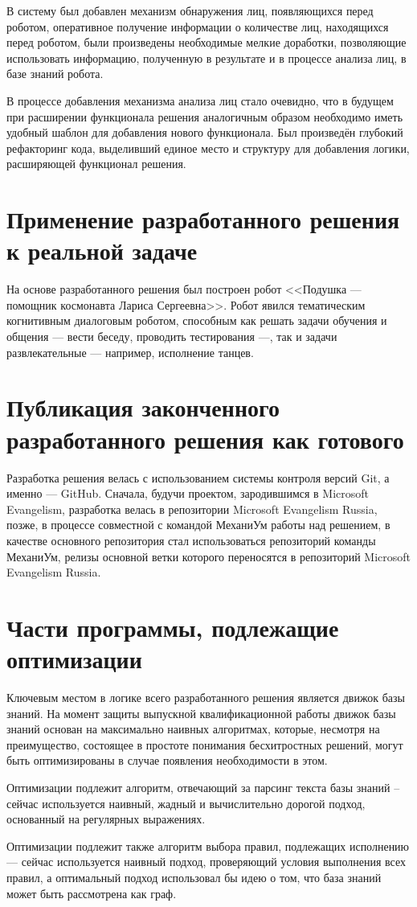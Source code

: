 В систему был добавлен механизм обнаружения лиц, появляющихся перед роботом, оперативное получение информации о количестве лиц, находящихся перед роботом, были произведены необходимые мелкие доработки, позволяющие использовать информацию, полученную в результате и в процессе анализа лиц, в базе знаний робота.

В процессе добавления механизма анализа лиц стало очевидно, что в будущем при расширении функционала решения аналогичным образом необходимо иметь удобный шаблон для добавления нового функционала. Был произведён глубокий рефакторинг кода, выделивший единое место и структуру для добавления логики, расширяющей функционал решения.


\section{Применение разработанного решения к реальной задаче}
На основе разработанного решения был построен робот <<Подушка --- помощник космонавта Лариса Сергеевна>>. Робот явился тематическим когнитивным диалоговым роботом, способным как решать задачи обучения и общения --- вести беседу, проводить тестирования ---, так и задачи развлекательные --- например, исполнение танцев.


\section{Публикация законченного разработанного решения как готового}
Разработка решения велась с использованием системы контроля версий Git, а именно --- GitHub. Сначала, будучи проектом, зародившимся в Microsoft Evangelism, разработка велась в репозитории Microsoft Evangelism Russia, позже, в процессе совместной с командой МеханиУм работы над решением, в качестве основного репозитория стал использоваться репозиторий команды МеханиУм, релизы основной ветки которого переносятся в репозиторий Microsoft Evangelism Russia.

\section{Части программы, подлежащие оптимизации}
Ключевым местом в логике всего разработанного решения является движок базы знаний. На момент защиты выпускной квалификационной работы движок базы знаний основан на максимально наивных алгоритмах, которые, несмотря на преимущество, состоящее в простоте понимания бесхитростных решений, могут быть оптимизированы в случае появления необходимости в этом.

Оптимизации подлежит алгоритм, отвечающий за парсинг текста базы знаний -- сейчас используется наивный, жадный и вычислительно дорогой подход, основанный на регулярных выражениях.

Оптимизации подлежит также алгоритм выбора правил, подлежащих исполнению --- сейчас используется наивный подход, проверяющий условия выполнения всех правил, а оптимальный подход использовал бы идею о том, что база знаний может быть рассмотрена как граф.